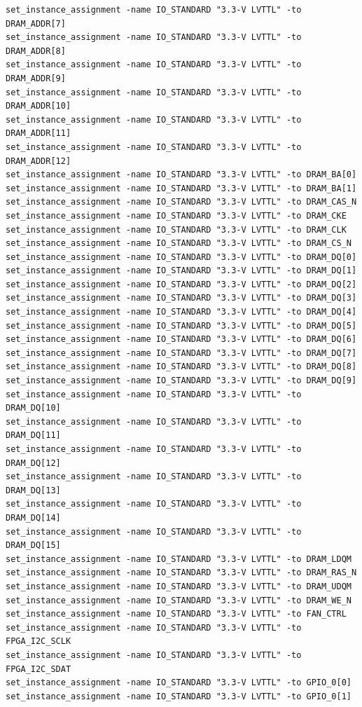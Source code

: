 \documentclass[conference]{IEEEtran}
\begin{document}
\begin{lstlisting}
set_instance_assignment -name IO_STANDARD "3.3-V LVTTL" -to DRAM_ADDR[7]
set_instance_assignment -name IO_STANDARD "3.3-V LVTTL" -to DRAM_ADDR[8]
set_instance_assignment -name IO_STANDARD "3.3-V LVTTL" -to DRAM_ADDR[9]
set_instance_assignment -name IO_STANDARD "3.3-V LVTTL" -to DRAM_ADDR[10]
set_instance_assignment -name IO_STANDARD "3.3-V LVTTL" -to DRAM_ADDR[11]
set_instance_assignment -name IO_STANDARD "3.3-V LVTTL" -to DRAM_ADDR[12]
set_instance_assignment -name IO_STANDARD "3.3-V LVTTL" -to DRAM_BA[0]
set_instance_assignment -name IO_STANDARD "3.3-V LVTTL" -to DRAM_BA[1]
set_instance_assignment -name IO_STANDARD "3.3-V LVTTL" -to DRAM_CAS_N
set_instance_assignment -name IO_STANDARD "3.3-V LVTTL" -to DRAM_CKE
set_instance_assignment -name IO_STANDARD "3.3-V LVTTL" -to DRAM_CLK
set_instance_assignment -name IO_STANDARD "3.3-V LVTTL" -to DRAM_CS_N
set_instance_assignment -name IO_STANDARD "3.3-V LVTTL" -to DRAM_DQ[0]
set_instance_assignment -name IO_STANDARD "3.3-V LVTTL" -to DRAM_DQ[1]
set_instance_assignment -name IO_STANDARD "3.3-V LVTTL" -to DRAM_DQ[2]
set_instance_assignment -name IO_STANDARD "3.3-V LVTTL" -to DRAM_DQ[3]
set_instance_assignment -name IO_STANDARD "3.3-V LVTTL" -to DRAM_DQ[4]
set_instance_assignment -name IO_STANDARD "3.3-V LVTTL" -to DRAM_DQ[5]
set_instance_assignment -name IO_STANDARD "3.3-V LVTTL" -to DRAM_DQ[6]
set_instance_assignment -name IO_STANDARD "3.3-V LVTTL" -to DRAM_DQ[7]
set_instance_assignment -name IO_STANDARD "3.3-V LVTTL" -to DRAM_DQ[8]
set_instance_assignment -name IO_STANDARD "3.3-V LVTTL" -to DRAM_DQ[9]
set_instance_assignment -name IO_STANDARD "3.3-V LVTTL" -to DRAM_DQ[10]
set_instance_assignment -name IO_STANDARD "3.3-V LVTTL" -to DRAM_DQ[11]
set_instance_assignment -name IO_STANDARD "3.3-V LVTTL" -to DRAM_DQ[12]
set_instance_assignment -name IO_STANDARD "3.3-V LVTTL" -to DRAM_DQ[13]
set_instance_assignment -name IO_STANDARD "3.3-V LVTTL" -to DRAM_DQ[14]
set_instance_assignment -name IO_STANDARD "3.3-V LVTTL" -to DRAM_DQ[15]
set_instance_assignment -name IO_STANDARD "3.3-V LVTTL" -to DRAM_LDQM
set_instance_assignment -name IO_STANDARD "3.3-V LVTTL" -to DRAM_RAS_N
set_instance_assignment -name IO_STANDARD "3.3-V LVTTL" -to DRAM_UDQM
set_instance_assignment -name IO_STANDARD "3.3-V LVTTL" -to DRAM_WE_N
set_instance_assignment -name IO_STANDARD "3.3-V LVTTL" -to FAN_CTRL
set_instance_assignment -name IO_STANDARD "3.3-V LVTTL" -to FPGA_I2C_SCLK
set_instance_assignment -name IO_STANDARD "3.3-V LVTTL" -to FPGA_I2C_SDAT
set_instance_assignment -name IO_STANDARD "3.3-V LVTTL" -to GPIO_0[0]
set_instance_assignment -name IO_STANDARD "3.3-V LVTTL" -to GPIO_0[1]

\end{lstlisting}
\end{document}
